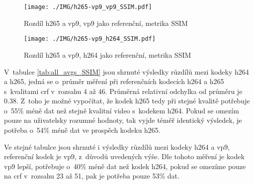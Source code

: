 \documentclass[thesis=M,czech]{FITthesis}[2016/06/26]
\begin{document}
\begin{figure}[]\centering
\texttt{[image: ./IMG/h265-vp9\_vp9\_SSIM.pdf]}
\caption{Rozdíl h265 a vp9, vp9 jako referenční, metrika SSIM}
\label{fig:h265-vp9_vp9_SSIM}
\end{figure}

\begin{figure}[]\centering
\texttt{[image: ./IMG/h265-vp9\_h264\_SSIM.pdf]}
\caption{Rozdíl h265 a vp9, h264 jako referenční, metrika SSIM}
\label{fig:h265-vp9_h264_SSIM}
\end{figure}

V~tabulce \ref{tab:all_avgs_SSIM} jsou shrnuté výsledky růzdílů mezi kodeky h264 a h265, jedná se o~průměr měření při referenčních kodecích h264 a h265 s~kvalitami crf v~rozsahu 4 až 46. Průměrná relativní odchylka od průměru je 0.38. Z~toho je možné vypočítat, že kodek h265 tedy při stejné kvalitě potřebuje o~55\% méně dat než stejně kvalitní video s~kodekem h264. Pokud se omezím pouze na uživatelsky rozumné hodnoty, tak vyjde téměř identický výsledek, je potřeba o~54\% méně dat ve prospěch kodeku h265.


Ve stejné tabulce jsou shrnuté i výsledky růzdílů mezi kodeky h264 a vp9, referenční kodek je vp9, z~důvodů uvedených výše. Dle tohoto měření je kodek vp9 lepší, potřebuje o~40\% méně dat než kodek h264, pokud se omezíme pouze na crf v~rozsahu 23 až 51, pak je potřeba pouze 53\% dat.
\end{document}
